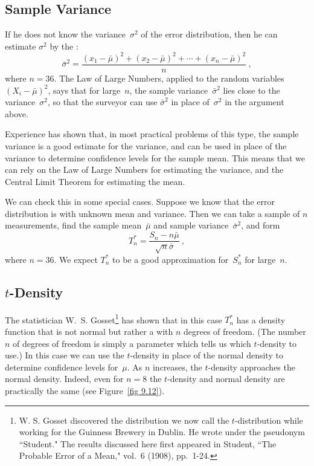 \subsection*{Sample Variance}
If he does not know the variance~$\sigma^2$ of the error distribution, then he
can estimate $\sigma^2$ by the :
$$
\bar \sigma^2 = \frac {(x_1 - \bar \mu)^2 + (x_2 - \bar \mu)^2
+\cdots+ (x_n - \bar \mu)^2}n\ ,
$$
where $n = 36$. 
The Law of Large Numbers, applied to the random variables $(X_i - \bar
\mu)^2$, says that for large~$n$, the sample variance~$\bar \sigma^2$ lies
close to the variance~$\sigma^2$, so that the surveyor can use $\bar
\sigma^2$ in place of~$\sigma^2$ in the argument above.
\par
Experience has shown that, in most practical problems of this type, the sample
variance is a good estimate for the variance, and can be used in place of the
variance to determine confidence levels for the sample mean.  This means that
we can rely on the Law of Large Numbers for estimating the variance, and the
Central Limit Theorem for estimating the mean.
\par
We can check this in some special cases.  Suppose we know that the error
distribution is  with unknown mean and variance.  Then we can take
a sample of $n$ measurements, find the sample mean~$\bar \mu$ and sample
variance~$\bar \sigma^2$, and form
$$
T_n^* = \frac {S_n - n\bar\mu}{\sqrt{n}\bar\sigma}\ ,
$$
where $n = 36$.  We expect $T_n^*$ to be a good approximation for~$S_n^*$ for 
large~$n$.

\subsection*{$t$-Density}
The statistician W.~S. Gosset\footnote{W. S. Gosset discovered the
distribution we now call the $t$-distribution while working for the Guinness Brewery in
Dublin.  He wrote under the pseudonym ``Student."  The results discussed here
first appeared in Student, ``The Probable Error of a Mean," 
vol.~6 (1908), pp.~1-24.} has shown that in this case $T_n^*$ has a density
function that is not normal but rather a  with $n$ degrees of freedom.  (The number $n$ of degrees of
freedom is simply a parameter which tells  us which $t$-density to use.)  In this case 
we can use the
$t$-density in place of the normal density to determine confidence levels for~$\mu$.  
As $n$ increases, the $t$-density approaches the normal density.  Indeed, even for 
$n = 8$ the $t$-density and normal density are practically the same 
(see Figure~\ref{fig 9.12}).

